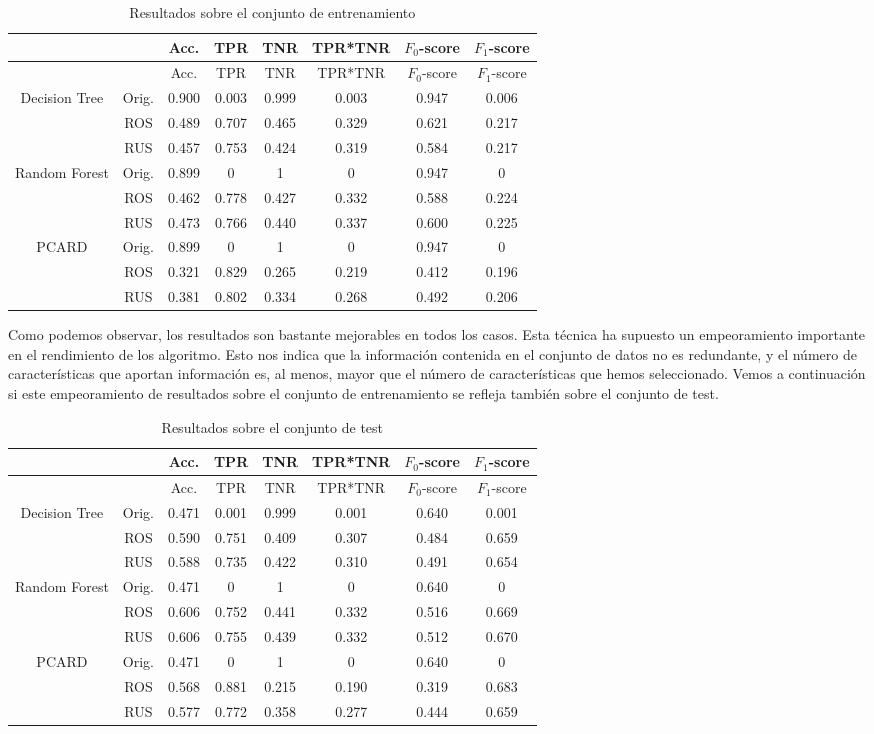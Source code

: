 \documentclass[
  a4paper,
,tablecaptionabove
]{scrartcl}
\begin{document}
\begin{longtable}[]{@{}cccccccc@{}}
\caption{Resultados sobre el conjunto de entrenamiento}\tabularnewline
\toprule
& & Acc. & TPR & TNR & TPR*TNR & \(F_0\)-score &
\(F_1\)-score\tabularnewline
\midrule
\endfirsthead
\toprule
& & Acc. & TPR & TNR & TPR*TNR & \(F_0\)-score &
\(F_1\)-score\tabularnewline
\midrule
\endhead
Decision Tree & Orig. & 0.900 & 0.003 & 0.999 & 0.003 & 0.947 & 0.006\tabularnewline
 & ROS & 0.489 & 0.707 & 0.465 & 0.329 & 0.621 &
0.217\tabularnewline
& RUS & 0.457 & 0.753 & 0.424 & 0.319 & 0.584 & 0.217\tabularnewline
\midrule
Random Forest & Orig. & 0.899 & 0 & 1 & 0 & 0.947 & 0\tabularnewline
& ROS & 0.462 & 0.778 & 0.427 & 0.332 & 0.588 &
0.224\tabularnewline
& RUS & 0.473 & 0.766 & 0.440 & 0.337 & 0.600 & 0.225\tabularnewline
\midrule
PCARD & Orig. & 0.899 & 0 & 1 & 0 & 0.947 & 0\tabularnewline
& ROS & 0.321 & 0.829 & 0.265 & 0.219 & 0.412 &
0.196\tabularnewline
& RUS & 0.381 & 0.802 & 0.334 & 0.268 & 0.492 & 0.206\tabularnewline
\bottomrule
\end{longtable}

Como podemos observar, los resultados son bastante mejorables en todos
los casos. Esta técnica ha supuesto un empeoramiento importante en el
rendimiento de los algoritmo. Esto nos indica que la información
contenida en el conjunto de datos no es redundante, y el número de
características que aportan información es, al menos, mayor que el
número de características que hemos seleccionado. Vemos a continuación
si este empeoramiento de resultados sobre el conjunto de entrenamiento
se refleja también sobre el conjunto de test.

\begin{longtable}[]{@{}cccccccc@{}}
\caption{Resultados sobre el conjunto de test}\tabularnewline
\toprule
& & Acc. & TPR & TNR & TPR*TNR & \(F_0\)-score &
\(F_1\)-score\tabularnewline
\midrule
\endfirsthead
\toprule
& & Acc. & TPR & TNR & TPR*TNR & \(F_0\)-score &
\(F_1\)-score\tabularnewline
\midrule
\endhead
Decision Tree & Orig. & 0.471 & 0.001 & 0.999 & 0.001 & 0.640 & 0.001\tabularnewline
& ROS & 0.590 & 0.751 & 0.409 & 0.307 & 0.484 &
0.659\tabularnewline
& RUS & 0.588 & 0.735 & 0.422 & 0.310 & 0.491 & 0.654\tabularnewline
\midrule
Random Forest & Orig. & 0.471 & 0 & 1 & 0 & 0.640 & 0\tabularnewline
& ROS & 0.606 & 0.752 & 0.441 & 0.332 & 0.516 &
0.669\tabularnewline
& RUS & 0.606 & 0.755 & 0.439 & 0.332 & 0.512 & 0.670\tabularnewline
\midrule
PCARD & Orig. & 0.471 & 0 & 1 & 0 & 0.640 & 0\tabularnewline
& ROS & 0.568 & 0.881 & 0.215 & 0.190 & 0.319 &
0.683\tabularnewline
& RUS & 0.577 & 0.772 & 0.358 & 0.277 & 0.444 & 0.659\tabularnewline
\bottomrule
\end{longtable}
\end{document}
